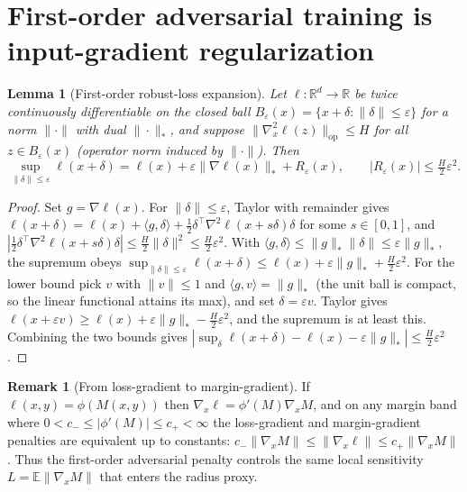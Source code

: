 \documentclass[11pt]{article}
\newtheorem{lemma}{Lemma}
\theoremstyle{definition}
\newtheorem{remark}{Remark}
\newcommand{\R}{\mathbb{R}}
\newcommand{\E}{\mathbb{E}}
\DeclareMathOperator{\op}{op}
\begin{document}
\section{First-order adversarial training is input-gradient regularization}

\begin{lemma}[First-order robust-loss expansion]\label{lem:first-order-at}
Let $\ell:\R^d\to\R$ be twice continuously differentiable on the closed ball
$B_\varepsilon(x)=\{x+\delta:\|\delta\|\le\varepsilon\}$ for a norm $\|\cdot\|$ with dual $\|\cdot\|_*$, and
suppose $\|\nabla^2_x\ell(z)\|_{\op}\le H$ for all $z\in B_\varepsilon(x)$ (operator norm induced by
$\|\cdot\|$). Then
\[
\sup_{\|\delta\|\le\varepsilon}\ell(x+\delta)=\ell(x)+\varepsilon\|\nabla\ell(x)\|_*+R_\varepsilon(x),
\qquad |R_\varepsilon(x)|\le\tfrac{H}{2}\varepsilon^2 .
\]
\end{lemma}
\begin{proof}
Set $g=\nabla\ell(x)$. For $\|\delta\|\le\varepsilon$, Taylor with remainder gives
$\ell(x+\delta)=\ell(x)+\langle g,\delta\rangle+\tfrac12\delta^\top\nabla^2\ell(x+s\delta)\delta$ for some
$s\in[0,1]$, and $|\tfrac12\delta^\top\nabla^2\ell(x+s\delta)\delta|\le\tfrac{H}{2}\|\delta\|^2\le\tfrac{H}{2}\varepsilon^2$.
With $\langle g,\delta\rangle\le\|g\|_*\|\delta\|\le\varepsilon\|g\|_*$, the supremum obeys
$\sup_{\|\delta\|\le\varepsilon}\ell(x+\delta)\le\ell(x)+\varepsilon\|g\|_*+\tfrac{H}{2}\varepsilon^2$.
For the lower bound pick $v$ with $\|v\|\le1$ and $\langle g,v\rangle=\|g\|_*$ (the unit ball is compact, so
the linear functional attains its max), and set $\delta=\varepsilon v$. Taylor gives
$\ell(x+\varepsilon v)\ge\ell(x)+\varepsilon\|g\|_*-\tfrac{H}{2}\varepsilon^2$, and the supremum is at least this.
Combining the two bounds gives $|\sup_\delta\ell(x+\delta)-\ell(x)-\varepsilon\|g\|_*|\le\tfrac{H}{2}\varepsilon^2$.
\end{proof}

\begin{remark}[From loss-gradient to margin-gradient]
If $\ell(x,y)=\phi(M(x,y))$ then $\nabla_x\ell=\phi'(M)\nabla_xM$, and on any margin band where
$0<c_-\le|\phi'(M)|\le c_+<\infty$ the loss-gradient and margin-gradient penalties are equivalent up to
constants: $c_-\|\nabla_xM\|\le\|\nabla_x\ell\|\le c_+\|\nabla_xM\|$. Thus the first-order adversarial
penalty controls the same local sensitivity $L=\E\|\nabla_xM\|$ that enters the radius proxy.
\end{remark}
\end{document}
